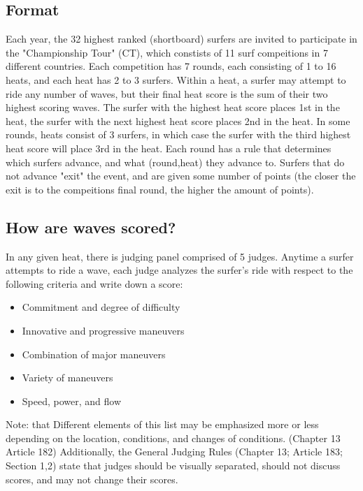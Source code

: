 \documentclass[12pt,a4paper]{article}
\begin{document}
\subsection{Format}
Each year, the 32 highest ranked (shortboard) surfers are invited to participate in the "Championship Tour" (CT), which constists of 11 surf compeitions in 7 different countries. Each competition has 7 rounds, each consisting of 1 to 16 heats, and each heat has 2 to 3 surfers. Within a heat, a surfer may attempt to ride any number of waves, but their final heat score is the sum of their two highest scoring waves. The surfer with the highest heat score places 1st in the heat, the surfer with the next highest heat score places 2nd in the heat. In some rounds, heats consist of 3 surfers, in which case the surfer with the third highest heat score will place 3rd in the heat. Each round has a rule that determines which surfers advance, and what (round,heat) they advance to. Surfers that do not advance "exit" the event, and are given some number of points (the closer the exit is to the compeitions final round, the higher the amount of points).


\subsection{How are waves scored?}
In any given heat, there is judging panel comprised of 5 judges. Anytime a surfer attempts to ride a wave, each judge analyzes the surfer's ride with respect to the following criteria and write down a score:

\begin{itemize}
\item Commitment and degree of difficulty


\item Innovative and progressive maneuvers


\item Combination of major maneuvers


\item Variety of maneuvers


\item Speed, power, and flow

\end{itemize}
Note: that Different elements of this list may be emphasized more or less depending on the location, conditions, and changes of conditions. (Chapter 13 Article 182) Additionally, the General Judging Rules (Chapter 13; Article 183; Section 1,2) state that judges should be visually separated, should not discuss scores, and may not change their scores.
\end{document}
